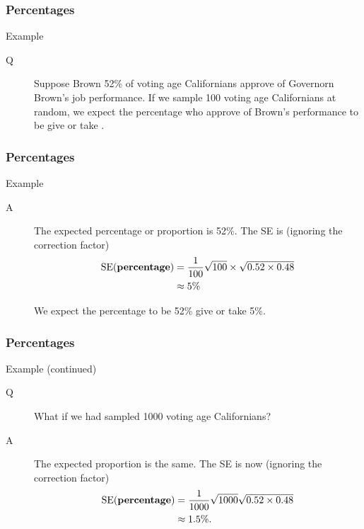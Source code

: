 \documentclass[handout]{beamer}
\begin{document}

   \begin{frame} \frametitle{Percentages}

   \begin{block}
   {Example}
   \begin{description}
   \item[Q] Suppose Brown 52\% of voting age Californians approve of
   Governorn Brown's job performance.
    If we sample 100 voting age Californians at random, we expect
   the percentage who approve of Brown's performance to be
   \underline{\hspace{1in}} give or take \underline{\hspace{1in}}.

   \end{description}
   \end{block}
   \end{frame}


   \begin{frame} \frametitle{Percentages}

   \begin{block}
   {Example}
   \begin{description}
   \item[A] The expected percentage or proportion is 52\%.
   The SE is (ignoring the correction factor)
   $$
   \begin{aligned}
   \text{SE({\bf percentage})} &= \frac{1}{100} \sqrt{100} \times \sqrt{0.52 \times 0.48} \\
   & \approx 5\%
   \end{aligned}
   $$

   We expect the percentage to be 52\% give or take 5\%.
   \end{description}
   \end{block}
   \end{frame}


   \begin{frame} \frametitle{Percentages}

   \begin{block}
   {Example (continued)}
   \begin{description}
   \item[Q] What if we had sampled 1000 voting age Californians?

   \item[A] The expected proportion is the same. The SE is now
   (ignoring the correction factor)
   $$
   \begin{aligned}
   \text{SE({\bf percentage})}
   & = \frac{1}{1000} \sqrt{1000} \sqrt{0.52 \times 0.48} \\
   & \approx 1.5\%.
   \end{aligned}
   $$
   \end{description}
   \end{block}
   \end{frame}
\end{document}
